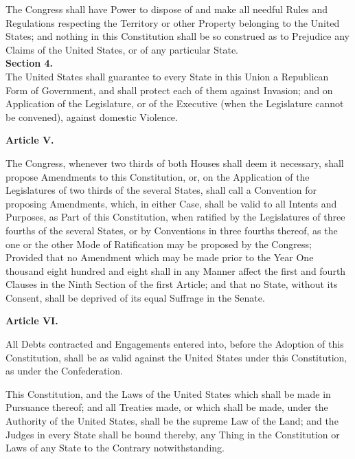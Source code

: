The Congress shall have Power to dispose of and make all needful Rules and Regulations respecting the Territory or other Property belonging to the United States; and nothing in this Constitution shall be so construed as to Prejudice any Claims of the United States, or of any particular State.\\[0.01in]

{\large \textbf{Section 4.}}\\[0.01in]

The United States shall guarantee to every State in this Union a Republican Form of Government, and shall protect each of them against Invasion; and on Application of the Legislature, or of the Executive (when the Legislature cannot be convened), against domestic Violence.\\[0.01in]

\begin{center}
{\Large \textbf{Article V.}}
\end{center}

The Congress, whenever two thirds of both Houses shall deem it necessary, shall propose Amendments to this Constitution, or, on the Application of the Legislatures of two thirds of the several States, shall call a Convention for proposing Amendments, which, in either Case, shall be valid to all Intents and Purposes, as Part of this Constitution, when ratified by the Legislatures of three fourths of the several States, or by Conventions in three fourths thereof, as the one or the other Mode of Ratification may be proposed by the Congress; Provided that no Amendment which may be made prior to the Year One thousand eight hundred and eight shall in any Manner affect the first and fourth Clauses in the Ninth Section of the first Article; and that no State, without its Consent, shall be deprived of its equal Suffrage in the Senate.\\[0.01in]

\begin{center}
{\Large \textbf{Article VI.}}
\end{center}

All Debts contracted and Engagements entered into, before the Adoption of this Constitution, shall be as valid against the United States under this Constitution, as under the Confederation.

This Constitution, and the Laws of the United States which shall be made in Pursuance thereof; and all Treaties made, or which shall be made, under the Authority of the United States, shall be the supreme Law of the Land; and the Judges in every State shall be bound thereby, any Thing in the Constitution or Laws of any State to the Contrary notwithstanding.

